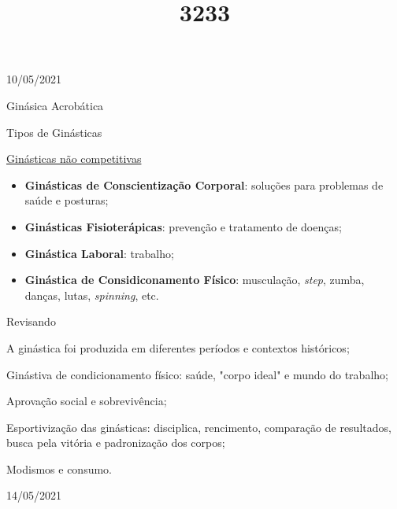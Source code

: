 \documentclass{SchoolBook}
\begin{document}
    \begin{day}{10/05/2021}
        \title{3}{Ginásica Acrobática}
        
        \title{2}{Tipos de Ginásticas}
        
        \title{3}{\underline{Ginásticas não competitivas}}
        
        \begin{itemize}[nosep]
            \item \textbf{Ginásticas de Conscientização Corporal}: soluções para problemas de saúde e posturas;
            \item \textbf{Ginásticas Fisioterápicas}: prevenção e tratamento de doenças;
            \item \textbf{Ginástica Laboral}: trabalho;
            \item \textbf{Ginástica de Considiconamento Físico}: musculação, \textit{step}, zumba, danças, lutas, \textit{spinning}, etc.
        \end{itemize}
        
        \title{3}{Revisando}
        
        A ginástica foi produzida em diferentes períodos e contextos históricos;
        
        Ginástiva de condicionamento físico: saúde, "corpo ideal" e mundo do trabalho;
        
        Aprovação social e sobrevivência;
        
        Esportivização das ginásticas: disciplica, rencimento, comparação de resultados, busca pela vitória e padronização dos corpos;
        
        Modismos e consumo.
    \end{day}
    
    \begin{day}{14/05/2021}
        
    \end{day}
\end{document}
